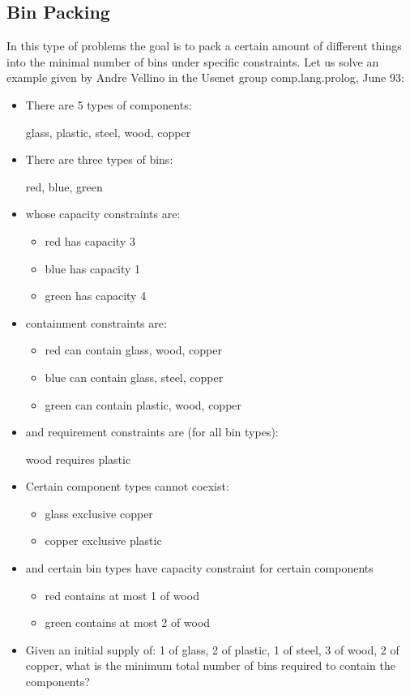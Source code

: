 \subsection{Bin Packing}
In this type of problems the goal is to pack a certain amount of
different things into the minimal number of bins under specific constraints.
Let us solve an example given by Andre Vellino in the Usenet
group comp.lang.prolog, June 93:
\begin{itemize}
\item There are 5 types of components:

        glass, plastic, steel, wood, copper

\item There are three types of bins:

        red, blue, green

\item        whose capacity constraints are:

\begin{itemize}
\item        red   has capacity 3
\item        blue  has capacity 1
\item green has capacity 4
\end{itemize}

\item containment constraints are:
\begin{itemize}
\item        red   can contain glass, wood, copper
\item        blue  can contain glass, steel, copper
\item   green can contain plastic, wood, copper
\end{itemize}

\item and requirement constraints are (for all bin types):

        wood requires plastic

\item Certain component types cannot coexist:

\begin{itemize}
\item glass  exclusive copper
\item        copper exclusive plastic
\end{itemize}

\item and certain bin types have capacity constraint for certain
components

\begin{itemize}
\item red   contains at most 1 of wood
\item green contains at most 2 of wood
\end{itemize}

\item Given an initial supply of:
1 of glass,
2 of plastic,
1 of steel,
3 of wood,
2 of copper,
what is the minimum total number of bins required to
contain the components?
\end{itemize}

